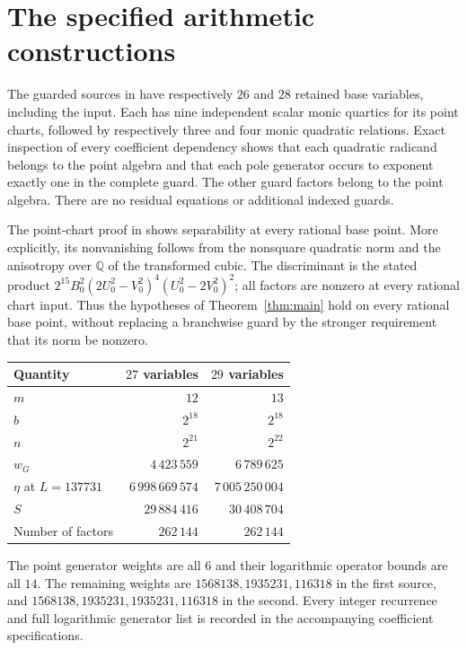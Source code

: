 \documentclass[11pt,a4paper]{article}
\newcommand{\Q}{\mathbb Q}\newcommand{\Z}{\mathbb Z}
\begin{document}
\section{The specified arithmetic constructions}

The guarded sources in \cite{Source27,Source29} have respectively
$26$ and $28$ retained base variables, including the input.
Each has nine independent scalar monic quartics for its point
charts, followed by respectively three and four monic quadratic
relations. Exact inspection of every coefficient dependency shows
that each quadratic radicand belongs to the point algebra and that
each pole generator occurs to exponent exactly one in the complete
guard. The other guard factors belong to the point algebra.
There are no residual equations or additional indexed guards.

The point-chart proof in \cite{Source27,Source29} shows separability
at every rational base point. More explicitly, its nonvanishing
follows from the nonsquare quadratic norm and the anisotropy over
$\Q$ of the transformed cubic. The discriminant is the stated
product
$2^{15}B_0^2(2U_0^2-V_0^2)^4(U_0^2-2V_0^2)^2$;
all factors are nonzero at every rational chart input.
Thus the hypotheses of Theorem~\ref{thm:main} hold on every
rational base point, without replacing a branchwise guard by
the stronger requirement that its norm be nonzero.

\begin{center}
\begin{tabular}{lrr}
\toprule
Quantity & $27$ variables & $29$ variables\\
\midrule
$m$ & $12$ & $13$\\
$b$ & $2^{18}$ & $2^{18}$\\
$n$ & $2^{21}$ & $2^{22}$\\
$w_G$ & $4\,423\,559$ & $6\,789\,625$\\
$\eta$ at $L=137731$ & $6\,998\,669\,574$ & $7\,005\,250\,004$\\
$S$ & $29\,884\,416$ & $30\,408\,704$\\
Number of factors & $262\,144$ & $262\,144$\\
\bottomrule
\end{tabular}
\end{center}
The point generator weights are all $6$ and their logarithmic
operator bounds are all $14$. The remaining weights are
$1568138,1935231,116318$ in the first source, and
$1568138,1935231,1935231,116318$ in the second.
Every integer recurrence and full logarithmic generator list is
recorded in the accompanying coefficient specifications.
\end{document}
